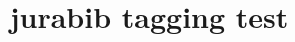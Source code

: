 \documentclass{article}
\title{jurabib tagging test}
\begin{document}
\cite{inbook-full}


\end{document}

